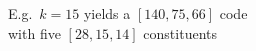 \documentclass[preview]{standalone}
\begin{document}
\begin{center}
E.g.\ $k=15$ yields a $[140,75,66]$ code\\with five $[28,15,14]$ constituents
\end{center}
\end{document}

